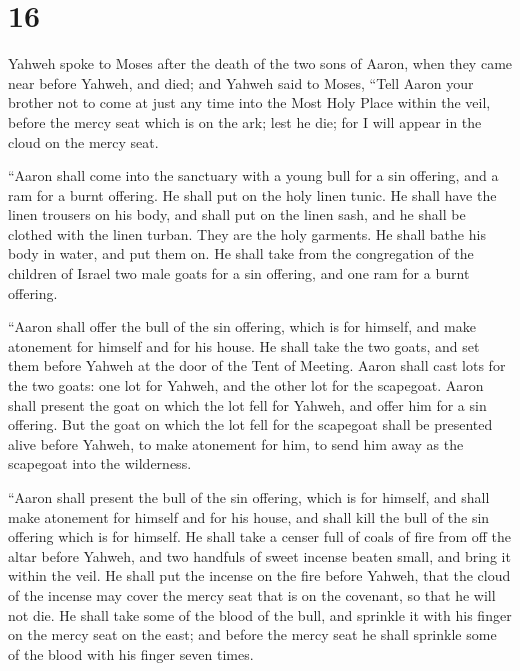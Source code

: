 \hypertarget{section-15}{%
\section{16}\label{section-15}}

 Yahweh spoke to Moses after the death of the two sons of
Aaron, when they came near before Yahweh, and died;  and
Yahweh said to Moses, ``Tell Aaron your brother not to come at just any
time into the Most Holy Place within the veil, before the mercy seat
which is on the ark; lest he die; for I will appear in the cloud on the
mercy seat.

 ``Aaron shall come into the sanctuary with a young bull
for a sin offering, and a ram for a burnt offering.  He
shall put on the holy linen tunic. He shall have the linen trousers on
his body, and shall put on the linen sash, and he shall be clothed with
the linen turban. They are the holy garments. He shall bathe his body in
water, and put them on.  He shall take from the
congregation of the children of Israel two male goats for a sin
offering, and one ram for a burnt offering.

 ``Aaron shall offer the bull of the sin offering, which
is for himself, and make atonement for himself and for his house.
 He shall take the two goats, and set them before Yahweh
at the door of the Tent of Meeting.  Aaron shall cast lots
for the two goats: one lot for Yahweh, and the other lot for the
scapegoat.  Aaron shall present the goat on which the lot
fell for Yahweh, and offer him for a sin offering.  But
the goat on which the lot fell for the scapegoat shall be presented
alive before Yahweh, to make atonement for him, to send him away as the
scapegoat into the wilderness.

 ``Aaron shall present the bull of the sin offering,
which is for himself, and shall make atonement for himself and for his
house, and shall kill the bull of the sin offering which is for himself.
 He shall take a censer full of coals of fire from off
the altar before Yahweh, and two handfuls of sweet incense beaten small,
and bring it within the veil.  He shall put the incense
on the fire before Yahweh, that the cloud of the incense may cover the
mercy seat that is on the covenant, so that he will not die.
 He shall take some of the blood of the bull, and
sprinkle it with his finger on the mercy seat on the east; and before
the mercy seat he shall sprinkle some of the blood with his finger seven
times.

